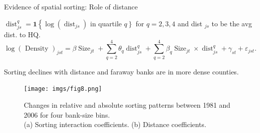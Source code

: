 \documentclass[notes,10pt, aspectratio=169]{beamer}
\newenvironment{wideitemize}{\itemize\addtolength{\itemsep}{10pt}}{\enditemize}
\begin{document}
\begin{frame}{Evidence of spatial sorting: Role of distance}
    
    \begin{wideitemize}
        \item   $\operatorname{dist}_{j s}^q=\mathbf{1}\left\{\log \left(\operatorname{dist}_{j s}\right)\right.$ in quartile $\left.q\right\}$ for $q=2,3,4$ and dist $_{j s}$ to be the avg dist. to HQ.  %
    $$
    \log (\text { Density })_{j s t}=\beta \operatorname{Size}_{j t}+\sum_{q=2}^4 \theta_q \operatorname{dist}_{j s}^q+\sum_{q=2}^4 \beta_q \operatorname{Size}_{j t} \times \operatorname{dist}_{j s}^q+\gamma_{s t}+\varepsilon_{j s t} .
    $$
    \item Sorting declines with distance and faraway banks are in more dense counties. 

    \end{wideitemize}
    \begin{figure}
        \centering
        \texttt{[image: imgs/fig8.png]}
        \caption*{Changes in relative and absolute sorting patterns between 1981 and 2006 for
        four bank-size bins.\\ (a) Sorting interaction coefficients. (b) Distance coefficients.}
        \label{fig:my_label}
    \end{figure}

  


    
    \end{frame}
\end{document}
